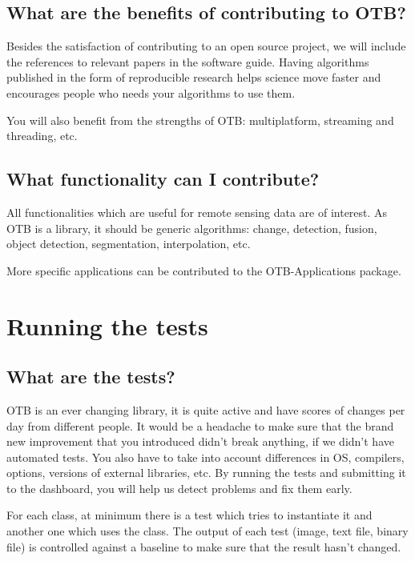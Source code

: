 \subsection{What are the benefits of contributing to OTB?}

Besides the satisfaction of contributing to an open source project, we will include
the references to relevant papers in the software guide. Having algorithms
published in the form of reproducible research helps science move faster and
encourages people who needs your algorithms to use them.

You will also benefit from the strengths of OTB: multiplatform, streaming and
threading, etc.

\subsection{What functionality can I contribute?}

All functionalities which are useful for remote sensing data are of interest. As
OTB is a library, it should be generic algorithms: change, detection, fusion,
object detection, segmentation, interpolation, etc.

More specific applications can be contributed to the OTB-Applications package.

\section{Running the tests}\label{sec:runningTheTests}

\subsection{What are the tests?}

OTB is an ever changing library, it is quite active and have scores of
changes per day from different people. It would be a headache to make
sure that the brand new improvement that you introduced didn't break
anything, if we didn't have automated tests. You also have to take into
account differences in OS, compilers, options, versions of external
libraries, etc. By running the tests and submitting it to the dashboard,
you will help us detect problems and fix them early.

For each class, at minimum there is a test which tries to instantiate it and another one which uses the class. The output of each test (image, text file, binary file) is controlled against a baseline to make sure that the result hasn't changed.

